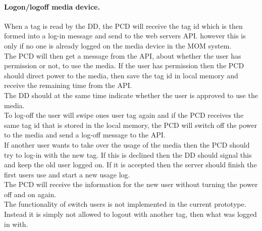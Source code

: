 \paragraph{Logon/logoff media device.}
\label{Logonlogoffmedia}
When a tag is read by the DD, the PCD will receive the tag id which is then formed into a log-in message and send to the web servers API. however this is only if no one is already logged on the media device in the MOM system.\\
The PCD will then get a message from the API, about whether the user has permission or not, to use the media. If the user has permission then the PCD should direct power to the media, then save the tag id in local memory and receive the remaining time from the API.\\
The DD should at the same time indicate whether the user is approved to use the media.\\

To log-off the user will swipe ones user tag again and if the PCD receives the same tag id that is stored in the local memory, the PCD will switch off the power to the media and send a log-off message to the API. \\
If another user wants to take over the usage of the media then the PCD should try to log-in with the new tag. If this is declined then the DD should signal this and keep the old user logged on. If it is accepted then the server should finish the first users use and start a new usage log.\\
The PCD will receive the information for the new user without turning the power off and on again.\\
The functionality of switch users is not implemented in the current prototype. Instead it is simply not allowed to logout with another tag, then what was logged in with.\\


